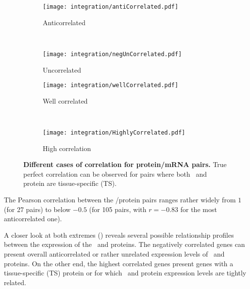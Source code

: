 \begin{figure}[!htbp]
    \begin{subfigure}[h]{0.5\textwidth}
        \centering \texttt{[image: integration/antiCorrelated.pdf]}
        \caption{Anticorrelated}\label{fig:caseAnticor}
    \end{subfigure}~%
    \begin{subfigure}[h]{0.5\textwidth}
        \centering \texttt{[image: integration/negUnCorrelated.pdf]}
        \caption{Uncorrelated}\label{fig:caseUncor}
    \end{subfigure}
    \vspace{2mm}

    \begin{subfigure}[h]{0.5\textwidth}
        \centering \texttt{[image: integration/wellCorrelated.pdf]}
        \caption{Well correlated}\label{fig:caseFairlyCor}
    \end{subfigure}~%
    \begin{subfigure}[h]{0.5\textwidth}
        \centering \texttt{[image: integration/HighlyCorrelated.pdf]}
        \caption{High correlation}\label{fig:caseHighlyCor}
    \end{subfigure}
    \caption[Different cases of correlation for protein/mRNA pairs]%
    {\label{fig:caseGene}\textbf{Different cases of correlation for
    protein/mRNA pairs.} True perfect correlation can be observed for pairs
    where both \mRNA\ and protein are tissue-specific (TS).}
\end{figure}

The Pearson correlation between the \mRNA/protein pairs ranges rather widely
from $1$ (for 27 pairs)
to below $-0.5$ (for 105 pairs,
with $r=-0.83$ for the  most anticorrelated one).\mybr\

A closer look at both extremes ()
reveals several possible relationship profiles
between the expression of the \mRNAs\ and proteins.
The negatively correlated genes can present
overall anticorrelated or rather unrelated expression levels
of \mRNAs\ and proteins.
On the other end,
the highest correlated genes present genes
with a tissue-specific (\gls{TS}) protein or
for which \mRNA\ and protein expression levels are tightly related.

